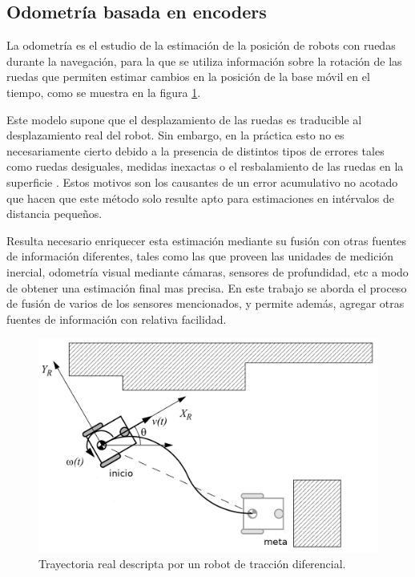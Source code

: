 \subsection{Odometría basada en encoders}

La odometría es el estudio de la estimación de la posición de robots con ruedas durante la navegación, para la que se utiliza información sobre la rotación de las ruedas que permiten estimar cambios en la posición de la base móvil en el tiempo, como se muestra en la figura \ref{fig:navigation}.

Este modelo supone que el desplazamiento de las ruedas es traducible al desplazamiento real del robot. Sin embargo, en la práctica esto no es necesariamente cierto debido a la presencia de distintos tipos de errores tales como ruedas desiguales, medidas inexactas o el resbalamiento de las ruedas en la superficie \citep{PAPER:2}. Estos motivos son los causantes de un error acumulativo no acotado que hacen que este método solo resulte apto para estimaciones en intérvalos de distancia pequeños.

Resulta necesario enriquecer esta estimación mediante su fusión con otras fuentes de información diferentes, tales como las que proveen las unidades de medición inercial, odometría visual mediante cámaras, sensores de profundidad, etc a modo de obtener una estimación final mas precisa. En este trabajo se aborda el proceso de fusión de varios de los sensores mencionados, y permite además, agregar otras fuentes de información con relativa facilidad.

\begin{figure}[ht]
    \centering
    \includegraphics[scale=0.8]{./Figures/navigation.png}
    \caption{Trayectoria real descripta por un robot de tracción diferencial.}
    \label{fig:navigation}
\end{figure}

